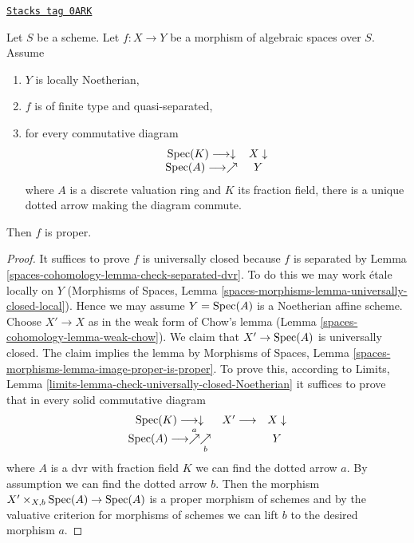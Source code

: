 \begin{lemma}
\label{spaces-cohomology-lemma-check-proper-dvr}
\href{https://stacks.math.columbia.edu/tag/0ARK}{\texttt{Stacks tag 0ARK}}

Let $S$ be a scheme. Let $f : X \to Y$ be a morphism of algebraic
spaces over $S$. Assume
\begin{enumerate}
\item $Y$ is locally Noetherian,
\item $f$ is of finite type and quasi-separated,
\item for every commutative diagram
$$
\begin{array}{cc}\operatorname{Spec}(K) \longrightarrow\downarrow & X \downarrow \\ \operatorname{Spec}(A) \longrightarrow\nearrow & Y\end{array}
$$
where $A$ is a discrete valuation ring and $K$ its fraction field,
there is a unique dotted arrow making the diagram commute.
\end{enumerate}
Then $f$ is proper.
\end{lemma}

\begin{proof}
It suffices to prove $f$ is universally closed because $f$ is separated by
Lemma \ref{spaces-cohomology-lemma-check-separated-dvr}.
To do this we may work \'etale locally on $Y$
(Morphisms of Spaces, Lemma
\ref{spaces-morphisms-lemma-universally-closed-local}).
Hence we may assume $Y = \operatorname{Spec}(A)$ is a Noetherian affine scheme.
Choose $X' \to X$ as in the weak form of Chow's lemma
(Lemma \ref{spaces-cohomology-lemma-weak-chow}). We claim that $X' \to \operatorname{Spec}(A)$
is universally closed. The claim implies the lemma by
Morphisms of Spaces, Lemma \ref{spaces-morphisms-lemma-image-proper-is-proper}.
To prove this, according to
Limits, Lemma \ref{limits-lemma-check-universally-closed-Noetherian}
it suffices to prove that in every solid commutative diagram
$$
\begin{array}{ccc}\operatorname{Spec}(K) \longrightarrow\downarrow & X' \longrightarrow & X \downarrow \\ \operatorname{Spec}(A) \longrightarrow\overset{a}{\nearrow}\underset{b}{\nearrow} &  & Y\end{array}
$$
where $A$ is a dvr with fraction field $K$ we can find the
dotted arrow $a$. By assumption we can find the dotted arrow $b$.
Then the morphism $X' \times_{X, b} \operatorname{Spec}(A) \to \operatorname{Spec}(A)$
is a proper morphism of schemes and by the valuative criterion
for morphisms of schemes we can lift $b$ to the desired morphism $a$.
\end{proof}

